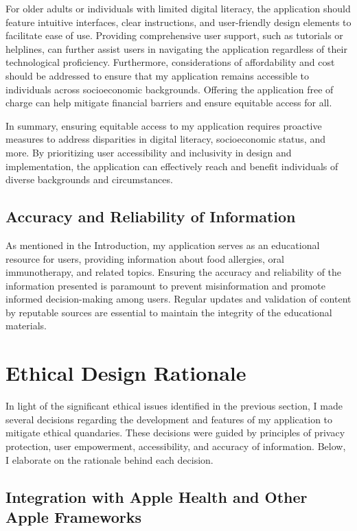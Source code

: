 For older adults or individuals with limited digital literacy, the application should feature intuitive interfaces, clear instructions, and user-friendly design elements to facilitate ease of use. Providing comprehensive user support, such as tutorials or helplines, can further assist users in navigating the application regardless of their technological proficiency. Furthermore, considerations of affordability and cost should be addressed to ensure that my application remains accessible to individuals across socioeconomic backgrounds. Offering the application free of charge can help mitigate financial barriers and ensure equitable access for all.

In summary, ensuring equitable access to my application requires proactive measures to address disparities in digital literacy, socioeconomic status, and more. By prioritizing user accessibility and inclusivity in design and implementation, the application can effectively reach and benefit individuals of diverse backgrounds and circumstances.

\subsection{Accuracy and Reliability of Information}
As mentioned in the Introduction, my application serves as an educational resource for users, providing information about food allergies, oral immunotherapy, and related topics. Ensuring the accuracy and reliability of the information presented is paramount to prevent misinformation and promote informed decision-making among users. Regular updates and validation of content by reputable sources are essential to maintain the integrity of the educational materials.

\section{Ethical Design Rationale}

In light of the significant ethical issues identified in the previous section, I made several decisions regarding the development and features of my application to mitigate ethical quandaries. These decisions were guided by principles of privacy protection, user empowerment, accessibility, and accuracy of information. Below, I elaborate on the rationale behind each decision.

\subsection{Integration with Apple Health and Other Apple Frameworks}

